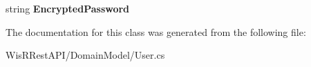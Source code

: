 \begin{DoxyCompactItemize}
\item 
\hypertarget{class_wis_r_1_1_domain_models_1_1_user_ac43d0f9a2128e012549cfc16acd8acaf}{}string {\bfseries Encrypted\+Password}\label{class_wis_r_1_1_domain_models_1_1_user_ac43d0f9a2128e012549cfc16acd8acaf}

\end{DoxyCompactItemize}


The documentation for this class was generated from the following file\+:\begin{DoxyCompactItemize}
\item 
Wis\+R\+Rest\+A\+P\+I/\+Domain\+Model/User.\+cs\end{DoxyCompactItemize}
